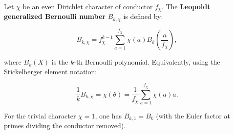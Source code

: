 Let $\chi$ be an even Dirichlet character of conductor $f_\chi$. The \textbf{Leopoldt
generalized Bernoulli number} $B_{k,\chi}$ is defined by:

$$B_{k,\chi} = f_\chi^{k-1} \sum_{a=1}^{f_\chi} \chi(a) B_k\!\left(\frac{a}{f_\chi}\right),$$

where $B_k(X)$ is the $k$-th Bernoulli polynomial. Equivalently, using the Stickelberger
element notation:

$$\frac{1}{k} B_{k,\chi} = \chi(\theta) = \frac{1}{f_\chi} \sum_{a=1}^{f_\chi} \chi(a) a.$$

For the trivial character $\chi = 1$, one has $B_{k,1} = B_k$ (with the Euler factor at
primes dividing the conductor removed).
